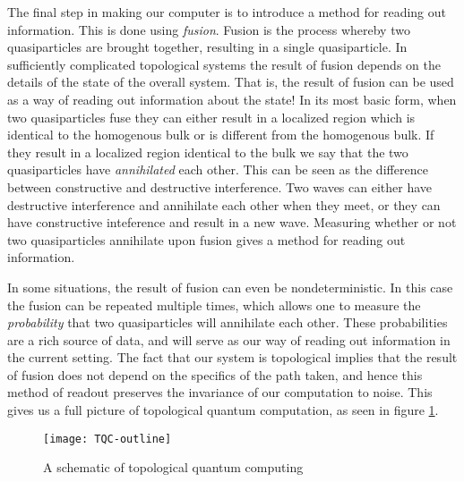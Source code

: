 The final step in making our computer is to introduce a method for reading out information. This is done using {\em fusion}. Fusion is the process whereby two quasiparticles are brought together, resulting in a single quasiparticle. In sufficiently complicated topological systems the result of fusion depends on the details of the state of the overall system. That is, the result of fusion can be used as a way of reading out information about the state! In its most basic form, when two quasiparticles fuse they can either result in a localized region which is identical to the homogenous bulk or is different from the homogenous bulk. If they result in a localized region identical to the bulk we say that the two quasiparticles have {\em annihilated} each other. This can be seen as the difference between constructive and destructive interference. Two waves can either have destructive interference and annihilate each other when they meet, or they can have constructive inteference and result in a new wave. Measuring whether or not two quasiparticles annihilate upon fusion gives a method for reading out information.

In some situations, the result of fusion can even be nondeterministic. In this case the fusion can be repeated multiple times, which allows one to measure the {\em probability} that two quasiparticles will annihilate each other. These probabilities are a rich source of data, and will serve as our way of reading out information in the current setting. The fact that our system is topological implies that the result of fusion does not depend on the specifics of the path taken, and hence this method of readout preserves the invariance of our computation to noise. This gives us a full picture of topological quantum computation, as seen in figure \ref{TQC-outline}.

\begin{figure}
\begin{center}
\texttt{[image: TQC-outline]}
\caption{A schematic of topological quantum computing}
\label{TQC-outline}
\end{center}
\end{figure}

